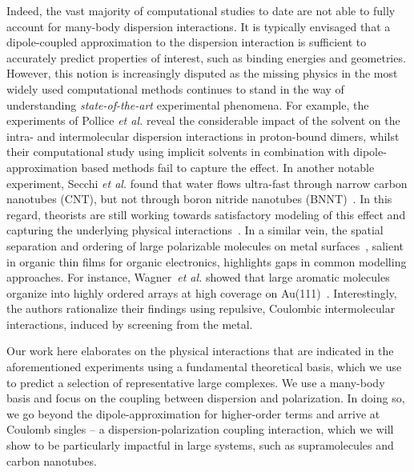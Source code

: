 \documentclass[aps,prl,groupaddress, twocolumn]{revtex4-1}  %
\begin{document}
Indeed, the vast majority of computational studies to date are not able to fully account for many-body dispersion interactions. It is typically envisaged that a dipole-coupled approximation to the dispersion interaction is sufficient to accurately predict properties of interest, such as binding energies and geometries. However, this notion is increasingly disputed as the missing physics in the most widely used computational methods continues to stand in the way of understanding \textit{state-of-the-art} experimental phenomena. For example, the experiments of Pollice \textit{et al.} reveal the considerable impact of the solvent on the intra- and intermolecular dispersion interactions in proton-bound dimers\cite{Pollice2017}, whilst their computational study using implicit solvents in combination with dipole-approximation based methods fail to capture the effect. In another notable experiment, Secchi \textit{et al.} found that water flows ultra-fast through narrow carbon nanotubes (CNT), but not through boron nitride nanotubes (BNNT)~\cite{secchi2016massive}. In this regard, theorists are still working towards satisfactory modeling of this effect and capturing the underlying physical interactions~\cite{Michaelides2016,Kannam2013,Striolo2016,Mattia2015266}. In a similar vein, the spatial separation and ordering of large polarizable molecules on metal surfaces~\cite{Wagner2010,Thussing2016}, salient in organic thin films for organic electronics, highlights gaps in common modelling approaches. For instance, Wagner~\textit{et al.} showed that large aromatic molecules organize into highly ordered arrays at high coverage on Au(111)~\cite{Wagner2010}. Interestingly, the authors rationalize their findings using repulsive, Coulombic intermolecular interactions, induced by screening from the metal. 

Our work here elaborates on the physical interactions that are indicated in the aforementioned experiments using a fundamental theoretical basis, which we use to predict a selection of representative large complexes. We use a many-body basis and focus on the coupling between dispersion and polarization. In doing so, we go beyond the dipole-approximation for higher-order terms and arrive at Coulomb singles – a dispersion-polarization coupling interaction, which we will show to be particularly impactful in large systems, such as supramolecules and carbon nanotubes.   
\end{document}
